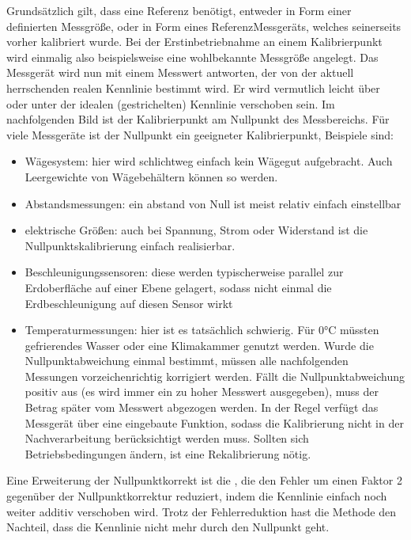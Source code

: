 \documentclass[letterpaper,10pt,english]{jupyterBook}
\begin{document}
\sphinxAtStartPar
Grundsätzlich gilt, dass eine Referenz benötigt, entweder in Form einer definierten Messgröße, oder in Form eines Referenz\sphinxhyphen{}Messgeräts, welches seinerseits vorher kalibriert wurde. Bei der Erstinbetriebnahme an einem Kalibrierpunkt wird einmalig also beispielsweise eine wohlbekannte Messgröße angelegt. Das Messgerät wird nun mit einem Messwert antworten, der von der aktuell herrschenden realen Kennlinie bestimmt wird. Er wird vermutlich leicht über oder unter der idealen (gestrichelten) Kennlinie verschoben sein. Im nachfolgenden Bild ist der Kalibrierpunkt am Nullpunkt des Messbereichs. Für viele Messgeräte ist der Nullpunkt ein geeigneter Kalibrierpunkt, Beispiele sind:
\begin{itemize}
\item {} 
\sphinxAtStartPar
Wägesystem: hier wird schlichtweg einfach kein Wägegut aufgebracht. Auch Leergewichte von Wägebehältern können so  werden.

\item {} 
\sphinxAtStartPar
Abstandsmessungen: ein abstand von Null ist meist relativ einfach einstellbar

\item {} 
\sphinxAtStartPar
elektrische Größen: auch bei Spannung, Strom oder Widerstand ist die Nullpunktskalibrierung einfach realisierbar.

\item {} 
\sphinxAtStartPar
Beschleunigungssensoren: diese werden typischerweise parallel zur Erdoberfläche auf einer Ebene gelagert, sodass nicht einmal die Erdbeschleunigung auf diesen Sensor wirkt

\item {} 
\sphinxAtStartPar
Temperaturmessungen: hier ist es tatsächlich schwierig. Für 0°C müssten gefrierendes Wasser oder eine Klimakammer genutzt werden.
Wurde die Nullpunktabweichung einmal bestimmt, müssen alle nachfolgenden Messungen vorzeichenrichtig korrigiert werden. Fällt die Nullpunktabweichung positiv aus (es wird immer ein zu hoher Messwert ausgegeben), muss der Betrag später vom Messwert abgezogen werden. In der Regel verfügt das Messgerät über eine eingebaute Funktion, sodass die Kalibrierung nicht in der Nachverarbeitung berücksichtigt werden muss. Sollten sich Betriebsbedingungen ändern, ist eine Rekalibrierung nötig.

\end{itemize}

\sphinxAtStartPar
Eine Erweiterung der Nullpunktkorrekt ist die , die den Fehler um einen Faktor 2 gegenüber der Nullpunktkorrektur reduziert, indem die Kennlinie einfach noch weiter additiv verschoben wird. Trotz der Fehlerreduktion hast die Methode den Nachteil, dass die Kennlinie nicht mehr durch den Nullpunkt geht.
\end{document}
